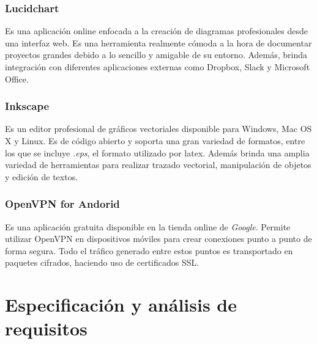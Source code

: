 \documentclass[12pt]{article}
\begin{document}
        \subsubsection{Lucidchart}
            Es una aplicación online enfocada a la creación de diagramas profesionales desde una interfaz web. Es una herramienta realmente cómoda a la hora de documentar proyectos grandes debido a lo sencillo y amigable de su entorno. Además, brinda integración con diferentes aplicaciones externas como Dropbox, Slack y Microsoft Office. 

        \subsubsection{Inkscape}
            Es un editor profesional de gráficos vectoriales disponible para Windows, Mac OS X y Linux. Es de código abierto y soporta una gran variedad de formatos, entre los que se incluye \textit{.eps}, el formato utilizado por latex. Además brinda una amplia variedad de herramientas para realizar trazado vectorial, manipulación de objetos y edición de textos.

        \subsubsection{OpenVPN for Andorid}
            Es una aplicación gratuita disponible en la tienda online de \textit{Google}. Permite utilizar OpenVPN en dispositivos móviles para crear conexiones punto a punto de forma segura. Todo el tráfico generado entre estos puntos es transportado en paquetes cifrados, haciendo uso de certificados SSL.


\section{Especificación y análisis de requisitos} \label{sec:req}
    
\end{document}
